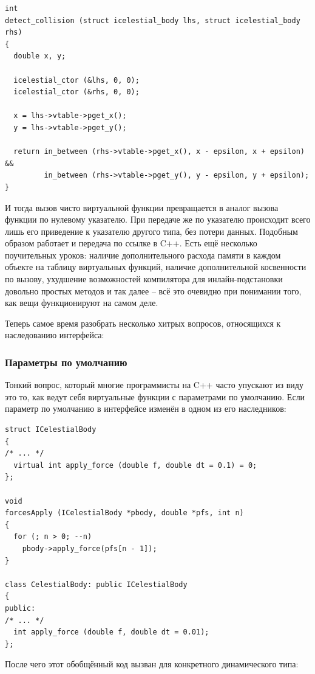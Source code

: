 \documentclass[a4paper,12pt,oneside]{article}
\begin{document}
\begin{lstlisting}
int
detect_collision (struct icelestial_body lhs, struct icelestial_body rhs)
{
  double x, y;
  
  icelestial_ctor (&lhs, 0, 0);
  icelestial_ctor (&rhs, 0, 0);

  x = lhs->vtable->pget_x();
  y = lhs->vtable->pget_y();
 
  return in_between (rhs->vtable->pget_x(), x - epsilon, x + epsilon) && 
         in_between (rhs->vtable->pget_y(), y - epsilon, y + epsilon);
}
\end{lstlisting}

И тогда вызов чисто виртуальной функции превращается в аналог вызова функции по нулевому указателю. При передаче же по указателю происходит всего лишь его приведение к указателю другого типа, без потери данных. Подобным образом работает и передача по ссылке в C++. Есть ещё несколько поучительных уроков: наличие дополнительного расхода памяти в каждом объекте на таблицу виртуальных функций, наличие дополнительной косвенности по вызову, ухудшение возможностей компилятора для инлайн-подстановки довольно простых методов и так далее -- всё это очевидно при понимании того, как вещи функционируют на самом деле.

Теперь самое время разобрать несколько хитрых вопросов, относящихся к наследованию интерфейса:

\subsubsection{Параметры по умолчанию}\label{DefArguments}

Тонкий вопрос, который многие программисты на C++ часто упускают из виду это то, как ведут себя виртуальные функции с параметрами по умолчанию. Если параметр по умолчанию в интерфейсе изменён в одном из его наследников:

\begin{lstlisting}
struct ICelestialBody
{
/* ... */
  virtual int apply_force (double f, double dt = 0.1) = 0;
};

void 
forcesApply (ICelestialBody *pbody, double *pfs, int n)
{
  for (; n > 0; --n)
    pbody->apply_force(pfs[n - 1]);
}

class CelestialBody: public ICelestialBody
{
public:
/* ... */
  int apply_force (double f, double dt = 0.01);
};
\end{lstlisting}

После чего этот обобщённый код вызван для конкретного динамического типа:
\end{document}
